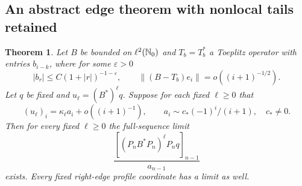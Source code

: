 \documentclass[11pt,letterpaper]{article}
\newtheorem{theorem}{Theorem}[section]
\theoremstyle{remark}\newtheorem{remark}[theorem]{Remark}
\newcommand{\eps}{\varepsilon}\newcommand{\HH}{\mathcal H}\newcommand{\one}{\mathbf1}
\begin{document}
\subsection{An abstract edge theorem with nonlocal tails retained}
\begin{theorem}\label{dsasm:thm:edge}
Let $B$ be bounded on $\ell^2(\mathbb N_0)$ and $T_b=T_b^*$ a Toeplitz
operator with entries $b_{i-k}$, where for some $\eps>0$
\[
 |b_r|\le C(1+|r|)^{-1-\eps},\qquad
 \|(B-T_b)e_i\|=o((i+1)^{-1/2}).
\]
Let $q$ be fixed and $u_\ell=(B^*)^\ell q$. Suppose for each fixed
$\ell\ge0$ that
\[
 (u_\ell)_i=\kappa_\ell a_i+o((i+1)^{-1}),\qquad
 a_i\sim c_*( -1)^i/(i+1),\quad c_*\ne0.
\]
Then for every fixed $\ell\ge0$ the full-sequence limit
\[
 \frac{[(P_nB^*P_n)^\ell P_nq]_{n-1}}{a_{n-1}}
\]
exists. Every fixed right-edge profile coordinate has a limit as well.
\end{theorem}
\end{document}
